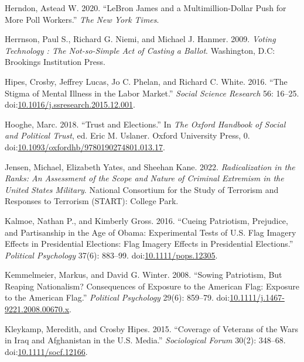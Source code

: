 \documentclass[
  12pt,
  letterpaper,
]{article}
\newlength{\cslhangindent}
\newenvironment{CSLReferences}[2] %
 {\begin{list}{}{%
  \setlength{\itemindent}{0pt}
  \setlength{\leftmargin}{0pt}
  \setlength{\parsep}{0pt}
  \ifodd #1
   \setlength{\leftmargin}{\cslhangindent}
   \setlength{\itemindent}{-1\cslhangindent}
  \fi
  \setlength{\itemsep}{#2\baselineskip}}}
 {\end{list}}
\begin{document}
\begin{CSLReferences}{1}{1}
Herndon, Astead W. 2020. {``{LeBron James} and a {Multimillion-Dollar
Push} for {More Poll Workers}.''} \emph{The New York Times}.

Herrnson, Paul S., Richard G. Niemi, and Michael J. Hanmer. 2009.
\emph{Voting Technology : The Not-so-Simple Act of Casting a Ballot}.
Washington, D.C: Brookings Institution Press.

Hipes, Crosby, Jeffrey Lucas, Jo C. Phelan, and Richard C. White. 2016.
{``The Stigma of Mental Illness in the Labor Market.''} \emph{Social
Science Research} 56: 16--25.
doi:\href{https://doi.org/10.1016/j.ssresearch.2015.12.001}{10.1016/j.ssresearch.2015.12.001}.

Hooghe, Marc. 2018. {``Trust and {Elections}.''} In \emph{The {Oxford
Handbook} of {Social} and {Political Trust}}, ed. Eric M. Uslaner.
Oxford University Press, 0.
doi:\href{https://doi.org/10.1093/oxfordhb/9780190274801.013.17}{10.1093/oxfordhb/9780190274801.013.17}.

Jensen, Michael, Elizabeth Yates, and Sheehan Kane. 2022.
\emph{Radicalization in the {Ranks}: {An Assessment} of the {Scope} and
{Nature} of {Criminal Extremism} in the {United States Military}}.
{National Consortium for the Study of Terrorism and Responses to
Terrorism (START): College Park}.

Kalmoe, Nathan P., and Kimberly Gross. 2016. {``Cueing {Patriotism},
{Prejudice}, and {Partisanship} in the {Age} of {Obama}: {Experimental
Tests} of {U}.{S}. {Flag Imagery Effects} in {Presidential Elections}:
{Flag Imagery Effects} in {Presidential Elections}.''} \emph{Political
Psychology} 37(6): 883--99.
doi:\href{https://doi.org/10.1111/pops.12305}{10.1111/pops.12305}.

Kemmelmeier, Markus, and David G. Winter. 2008. {``Sowing {Patriotism},
{But Reaping Nationalism}? {Consequences} of {Exposure} to the {American
Flag}: {Exposure} to the {American Flag}.''} \emph{Political Psychology}
29(6): 859--79.
doi:\href{https://doi.org/10.1111/j.1467-9221.2008.00670.x}{10.1111/j.1467-9221.2008.00670.x}.

Kleykamp, Meredith, and Crosby Hipes. 2015. {``Coverage of {Veterans} of
the {Wars} in {Iraq} and {Afghanistan} in the {U}.{S}. {Media}.''}
\emph{Sociological Forum} 30(2): 348--68.
doi:\href{https://doi.org/10.1111/socf.12166}{10.1111/socf.12166}.


\end{CSLReferences}
\end{document}
